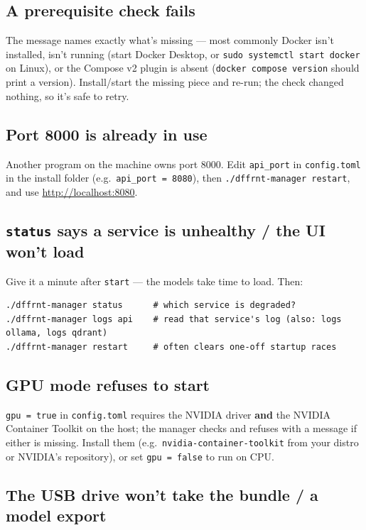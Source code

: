 \documentclass[11pt,letterpaper]{article}
\begin{document}
\subsection{A prerequisite check fails}

The message names exactly what's missing --- most commonly Docker isn't
installed, isn't running (start Docker Desktop, or \texttt{sudo systemctl
start docker} on Linux), or the Compose v2 plugin is absent (\texttt{docker
compose version} should print a version). Install/start the missing piece and
re-run; the check changed nothing, so it's safe to retry.

\subsection{Port 8000 is already in use}

Another program on the machine owns port 8000. Edit \texttt{api\_port} in
\texttt{config.toml} in the install folder (e.g.\ \texttt{api\_port = 8080}),
then \texttt{./dffrnt-manager restart}, and use
\url{http://localhost:8080}.

\subsection{\texttt{status} says a service is unhealthy / the UI won't load}

Give it a minute after \texttt{start} --- the models take time to load. Then:

\begin{lstlisting}
./dffrnt-manager status      # which service is degraded?
./dffrnt-manager logs api    # read that service's log (also: logs ollama, logs qdrant)
./dffrnt-manager restart     # often clears one-off startup races
\end{lstlisting}

\subsection{GPU mode refuses to start}

\texttt{gpu = true} in \texttt{config.toml} requires the NVIDIA driver
\textbf{and} the NVIDIA Container Toolkit on the host; the manager checks and
refuses with a message if either is missing. Install them (e.g.\
\texttt{nvidia-container-toolkit} from your distro or NVIDIA's repository),
or set \texttt{gpu = false} to run on CPU.

\subsection{The USB drive won't take the bundle / a model export}
\end{document}
